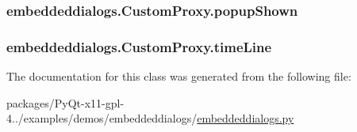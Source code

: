 \subsubsection[{popup\+Shown}]{\setlength{\rightskip}{0pt plus 5cm}embeddeddialogs.\+Custom\+Proxy.\+popup\+Shown}\label{classembeddeddialogs_1_1CustomProxy_a191d2b59da71aacbe5b6bbe375e5d34f}
\hypertarget{classembeddeddialogs_1_1CustomProxy_a230ba62e7c8fee07fc0be8db497bc978}{}
\subsubsection[{time\+Line}]{\setlength{\rightskip}{0pt plus 5cm}embeddeddialogs.\+Custom\+Proxy.\+time\+Line}\label{classembeddeddialogs_1_1CustomProxy_a230ba62e7c8fee07fc0be8db497bc978}


The documentation for this class was generated from the following file\+:\begin{DoxyCompactItemize}
\item 
packages/\+Py\+Qt-\/x11-\/gpl-\/4../examples/demos/embeddeddialogs/\hyperlink{embeddeddialogs_8py}{embeddeddialogs.\+py}\end{DoxyCompactItemize}
